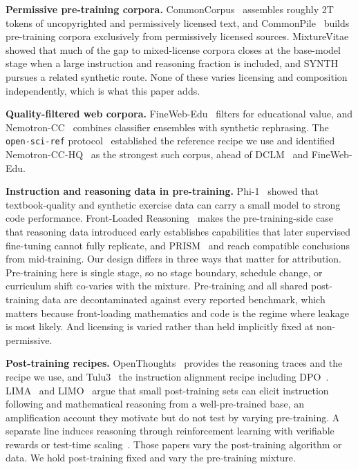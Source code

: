 \documentclass{article}
\begin{document}
\textbf{Permissive pre-training corpora.} CommonCorpus~\citep{langlais2025commoncorpus} assembles roughly 2T tokens of uncopyrighted and permissively licensed text, and CommonPile~\citep{kandpal2025commonpilev018tb_arxiv} builds pre-training corpora exclusively from permissively licensed sources. MixtureVitae~\citep{nguyen2025mixturevitae_arxiv} showed that much of the gap to mixed-license corpora closes at the base-model stage when a large instruction and reasoning fraction is included, and SYNTH~\citep{synthpleias2025} pursues a related synthetic route. None of these varies licensing and composition independently, which is what this paper adds.

\textbf{Quality-filtered web corpora.} FineWeb-Edu~\citep{penedo2024fineweb} filters for educational value, and Nemotron-CC~\citep{su2025nemotroncctransformingcommoncrawl} combines classifier ensembles with synthetic rephrasing. The \texttt{open-sci-ref} protocol~\citep{nezhurina2025opensciref} established the reference recipe we use and identified Nemotron-CC-HQ~\citep{blakeman2025nemotron} as the strongest such corpus, ahead of DCLM~\citep{li2024datacomplm} and FineWeb-Edu.

\textbf{Instruction and reasoning data in pre-training.} Phi-1~\citep{gunasekar2023phi1} showed that textbook-quality and synthetic exercise data can carry a small model to strong code performance. Front-Loaded Reasoning~\citep{akter2025front} makes the pre-training-side case that reasoning data introduced early establishes capabilities that later supervised fine-tuning cannot fully replicate, and PRISM~\citep{runwal2026prism} and \citet{zhang2026interplay} reach compatible conclusions from mid-training. Our design differs in three ways that matter for attribution. Pre-training here is single stage, so no stage boundary, schedule change, or curriculum shift co-varies with the mixture. Pre-training and all shared post-training data are decontaminated against every reported benchmark, which matters because front-loading mathematics and code is the regime where leakage is most likely. And licensing is varied rather than held implicitly fixed at non-permissive.

\textbf{Post-training recipes.} OpenThoughts~\citep{guha2025openthoughts} provides the reasoning traces and the recipe we use, and Tulu3~\citep{lambert2024tulu} the instruction alignment recipe including DPO~\citep{rafailov2023direct}. LIMA~\citep{zhou2023lima} and LIMO~\citep{yelimo} argue that small post-training sets can elicit instruction following and mathematical reasoning from a well-pre-trained base, an amplification account they motivate but do not test by varying pre-training. A separate line induces reasoning through reinforcement learning with verifiable rewards or test-time scaling~\citep{guo2025deepseek,yu2025dapo,muennighoff2025s1}. Those papers vary the post-training algorithm or data. We hold post-training fixed and vary the pre-training mixture.
\end{document}
